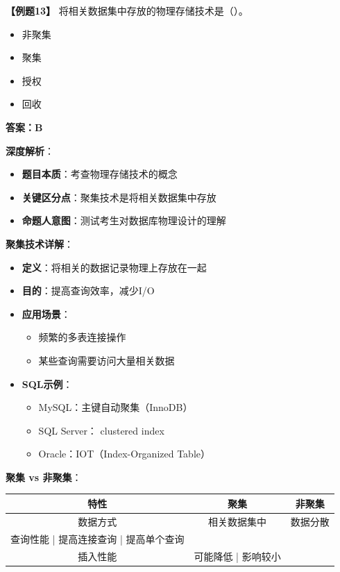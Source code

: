 \documentclass[12pt, a4paper]{article}
\newenvironment{bluebox}[1]{%
  \begin{trivlist}
  \item[\hskip\labelsep \textbf{#1}]
  \setlength{\parskip}{0.5ex}
  \setlength{\itemsep}{0.5ex}
}{%
  \end{trivlist}
  }
\begin{document}
\begin{bluebox}{例题13：聚集存储}
	\textbf{【例题13】} 将相关数据集中存放的物理存储技术是（\quad）。

	\begin{itemize}
		\item[A)] 非聚集
		\item[B)] 聚集
		\item[C)] 授权
		\item[D)] 回收
	\end{itemize}

	\textbf{答案：B}

	\textbf{深度解析}：

	\begin{itemize}[leftmargin=*, nosep]
		\item \textbf{题目本质}：考查物理存储技术的概念
		\item \textbf{关键区分点}：聚集技术是将相关数据集中存放
		\item \textbf{命题人意图}：测试考生对数据库物理设计的理解
	\end{itemize}

	\textbf{聚集技术详解}：

	\begin{itemize}[leftmargin=*, nosep]
		\item \textbf{定义}：将相关的数据记录物理上存放在一起
		\item \textbf{目的}：提高查询效率，减少I/O
		\item \textbf{应用场景}：
		      \begin{itemize}[nosep]
			      \item 频繁的多表连接操作
			      \item 某些查询需要访问大量相关数据
		      \end{itemize}
		\item \textbf{SQL示例}：
		      \begin{itemize}[nosep]
			      \item MySQL：主键自动聚集（InnoDB）
			      \item SQL Server： clustered index
			      \item Oracle：IOT（Index-Organized Table）
		      \end{itemize}
	\end{itemize}

	\textbf{聚集 vs 非聚集}：

	\begin{tabular}{|c|c|c|}
		\hline
		\textbf{特性} & \textbf{聚集} & \textbf{非聚集} \\
		\hline
		数据方式        & 相关数据集中      & 数据分散         \\
		\hline
		查询性能 | 提高连接查询 | 提高单个查询                   \\
		\hline
		插入性能        & 可能降低 | 影响较小                \\
		\hline
	\end{tabular}


\end{bluebox}
\end{document}
